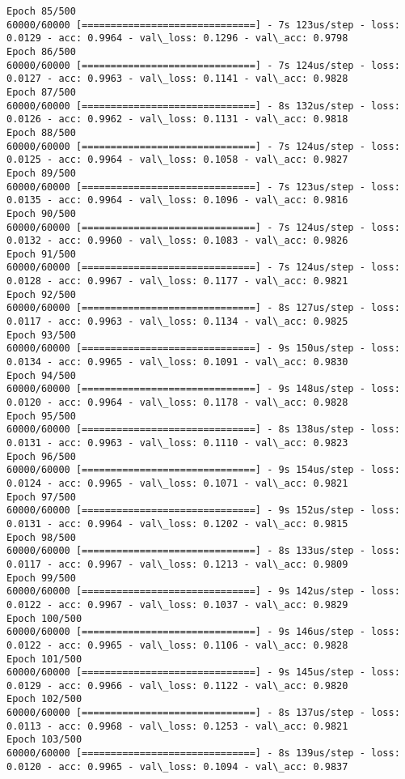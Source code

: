 \documentclass[11pt]{article}
\begin{document}
\begin{Verbatim}[commandchars=\\\{\}]
Epoch 85/500
60000/60000 [==============================] - 7s 123us/step - loss: 0.0129 - acc: 0.9964 - val\_loss: 0.1296 - val\_acc: 0.9798
Epoch 86/500
60000/60000 [==============================] - 7s 124us/step - loss: 0.0127 - acc: 0.9963 - val\_loss: 0.1141 - val\_acc: 0.9828
Epoch 87/500
60000/60000 [==============================] - 8s 132us/step - loss: 0.0126 - acc: 0.9962 - val\_loss: 0.1131 - val\_acc: 0.9818
Epoch 88/500
60000/60000 [==============================] - 7s 124us/step - loss: 0.0125 - acc: 0.9964 - val\_loss: 0.1058 - val\_acc: 0.9827
Epoch 89/500
60000/60000 [==============================] - 7s 123us/step - loss: 0.0135 - acc: 0.9964 - val\_loss: 0.1096 - val\_acc: 0.9816
Epoch 90/500
60000/60000 [==============================] - 7s 124us/step - loss: 0.0132 - acc: 0.9960 - val\_loss: 0.1083 - val\_acc: 0.9826
Epoch 91/500
60000/60000 [==============================] - 7s 124us/step - loss: 0.0128 - acc: 0.9967 - val\_loss: 0.1177 - val\_acc: 0.9821
Epoch 92/500
60000/60000 [==============================] - 8s 127us/step - loss: 0.0117 - acc: 0.9963 - val\_loss: 0.1134 - val\_acc: 0.9825
Epoch 93/500
60000/60000 [==============================] - 9s 150us/step - loss: 0.0134 - acc: 0.9965 - val\_loss: 0.1091 - val\_acc: 0.9830
Epoch 94/500
60000/60000 [==============================] - 9s 148us/step - loss: 0.0120 - acc: 0.9964 - val\_loss: 0.1178 - val\_acc: 0.9828
Epoch 95/500
60000/60000 [==============================] - 8s 138us/step - loss: 0.0131 - acc: 0.9963 - val\_loss: 0.1110 - val\_acc: 0.9823
Epoch 96/500
60000/60000 [==============================] - 9s 154us/step - loss: 0.0124 - acc: 0.9965 - val\_loss: 0.1071 - val\_acc: 0.9821
Epoch 97/500
60000/60000 [==============================] - 9s 152us/step - loss: 0.0131 - acc: 0.9964 - val\_loss: 0.1202 - val\_acc: 0.9815
Epoch 98/500
60000/60000 [==============================] - 8s 133us/step - loss: 0.0117 - acc: 0.9967 - val\_loss: 0.1213 - val\_acc: 0.9809
Epoch 99/500
60000/60000 [==============================] - 9s 142us/step - loss: 0.0122 - acc: 0.9967 - val\_loss: 0.1037 - val\_acc: 0.9829
Epoch 100/500
60000/60000 [==============================] - 9s 146us/step - loss: 0.0122 - acc: 0.9965 - val\_loss: 0.1106 - val\_acc: 0.9828
Epoch 101/500
60000/60000 [==============================] - 9s 145us/step - loss: 0.0129 - acc: 0.9966 - val\_loss: 0.1122 - val\_acc: 0.9820
Epoch 102/500
60000/60000 [==============================] - 8s 137us/step - loss: 0.0113 - acc: 0.9968 - val\_loss: 0.1253 - val\_acc: 0.9821
Epoch 103/500
60000/60000 [==============================] - 8s 139us/step - loss: 0.0120 - acc: 0.9965 - val\_loss: 0.1094 - val\_acc: 0.9837

\end{Verbatim}
\end{document}
